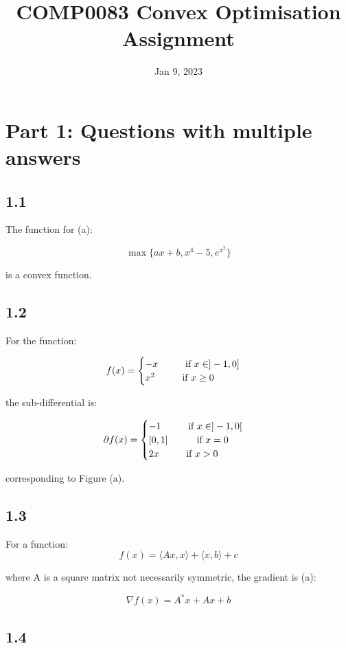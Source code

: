 \documentclass[12pt]{article}
\title{\textbf{COMP0083 Convex Optimisation Assignment}}
\date{Jan 9, 2023}
\newcommand\tab[1][1cm]{\hspace*{#1}}
\begin{document}
\maketitle
\section*{Part 1: Questions with multiple answers}
\subsection*{1.1}

The function for (a):

\[\max\{ax+b, x^4-5, e^{x^2}\}\]

is a convex function.

\subsection*{1.2}

For the function:

\[f(x) = \begin{cases}
      -x \tab \text{if } x \in ]-1, 0] \\
      x^2 \tab \text{if } x \geq 0 \\
   \end{cases}\]

the sub-differential is:

\[\partial f(x) = \begin{cases}
      -1 \tab \text{if } x \in ]-1, 0[ \\
      \left[0, 1\right] \tab \text{if } x = 0  \\
      2x \tab \text{if } x > 0 \\
   \end{cases}\]

corresponding to Figure (a).

\subsection*{1.3}
For a function:
\[f(x) = \langle Ax, x \rangle + \langle x, b\rangle + c\]

where A is a square matrix not necessarily symmetric, the gradient is (a):

\[\nabla f(x) = A^*x + Ax + b\]

\subsection*{1.4}
\end{document}
